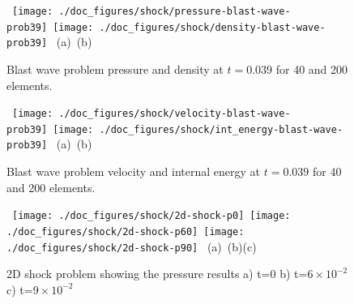 
\begin{figure}[H]
\vbox{
\hbox{
\hspace{-1.cm}
\texttt{[image: ./doc\_figures/shock/pressure-blast-wave-prob39]}
\hspace{-1.cm}
\texttt{[image: ./doc\_figures/shock/density-blast-wave-prob39]}
}
\vspace{-0.cm}
\hbox{\hspace{4.cm}(a) \hspace{4.5cm}(b)}
\vspace{-0.cm}}
\label{blast-wave--prob-pd39}
\caption{ Blast wave problem pressure and density at $t=0.039$ for 
40 and 200 elements. }
\end{figure}


\begin{figure}[H]
\vbox{
\hbox{
\hspace{-1.cm}
\texttt{[image: ./doc\_figures/shock/velocity-blast-wave-prob39]}
\hspace{-1.cm}
\texttt{[image: ./doc\_figures/shock/int\_energy-blast-wave-prob39]}
}
\vspace{-0.cm}
\hbox{\hspace{4.cm}(a) \hspace{4.5cm}(b)}
\vspace{-0.cm}}
\label{blast-wave--prob-ve39}
\caption{ Blast wave problem velocity and internal energy 
at $t=0.039$ for 40 and 200 elements. }
\end{figure}



\begin{figure}[H]
\vbox{
\hbox{
\hspace{-1.cm}
\texttt{[image: ./doc\_figures/shock/2d-shock-p0]}
\hspace{-1.cm}
\texttt{[image: ./doc\_figures/shock/2d-shock-p60]}
\hspace{-1.cm}
\texttt{[image: ./doc\_figures/shock/2d-shock-p90]}
}
\vspace{-0.cm}
\hbox{\hspace{4.cm}(a) \hspace{4.5cm}(b)\hspace{4.5cm}(c)}
\vspace{-0.cm}}
\label{2d-pressure-mesh}
\caption{ 2D shock problem showing the pressure results a) 
t=0 b) t=$6\times 10^{-2}$ c) t=$9\times 10^{-2}$ }
\end{figure}

